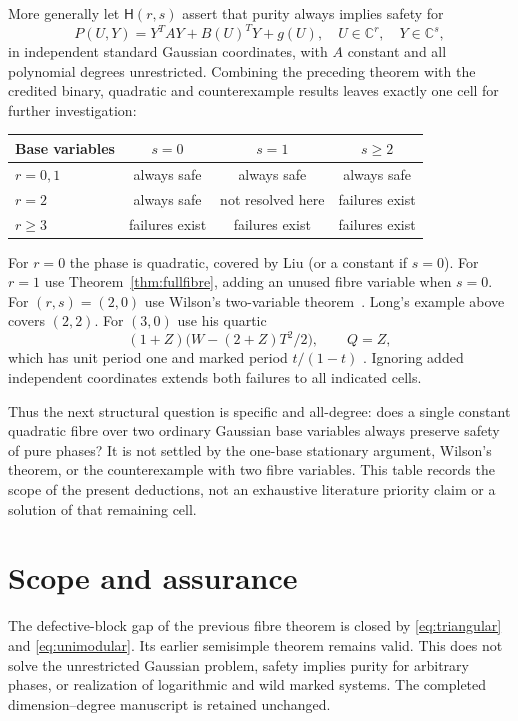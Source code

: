 \documentclass[11pt]{article}
\theoremstyle{definition}\newtheorem{definition}[theorem]{Definition}
\theoremstyle{remark}\newtheorem{remark}[theorem]{Remark}
\newcommand{\C}{\mathbb C}
\begin{document}
More generally let $\mathsf H(r,s)$ assert that purity always
implies safety for
\[
 P(U,Y)=Y^TAY+B(U)^TY+g(U),\quad
 U\in\C^r,\quad Y\in\C^s,
\]
in independent standard Gaussian coordinates, with $A$ constant
and all polynomial degrees unrestricted. Combining the preceding
theorem with the credited binary, quadratic and counterexample
results leaves exactly one cell for further investigation:
\begin{center}
\begin{tabular}{@{}lccc@{}}
\toprule
Base variables & $s=0$ & $s=1$ & $s\ge2$\\\midrule
$r=0,1$ & always safe & always safe & always safe\\
$r=2$ & always safe & not resolved here & failures exist\\
$r\ge3$ & failures exist & failures exist & failures exist\\
\bottomrule
\end{tabular}
\end{center}
For $r=0$ the phase is quadratic, covered by Liu (or a constant
if $s=0$). For $r=1$ use Theorem~\ref{thm:fullfibre}, adding
an unused fibre variable when $s=0$. For $(r,s)=(2,0)$ use Wilson's
two-variable theorem~\cite[Theorem~1]{Wilson}. Long's example
above covers $(2,2)$. For $(3,0)$ use his quartic
\[
 (1+Z)\bigl(W-(2+Z)T^2/2\bigr),\qquad Q=Z,
\]
which has unit period one and marked period $t/(1-t)$
\cite[Theorem~5.1]{Long}. Ignoring added independent coordinates
extends both failures to all indicated cells.

Thus the next structural question is specific and all-degree:
does a single constant quadratic fibre over two ordinary Gaussian
base variables always preserve safety of pure phases? It is not
settled by the one-base stationary argument, Wilson's theorem,
or the counterexample with two fibre variables. This table
records the scope of the present deductions, not an exhaustive
literature priority claim or a solution of that remaining cell.

\section{Scope and assurance}

The defective-block gap of the previous fibre theorem is closed
by \eqref{eq:triangular} and \eqref{eq:unimodular}. Its earlier
semisimple theorem remains valid. This does not solve the
unrestricted Gaussian problem, safety implies purity for arbitrary
phases, or realization of logarithmic and wild marked systems.
The completed dimension--degree manuscript is retained unchanged.
\end{document}
